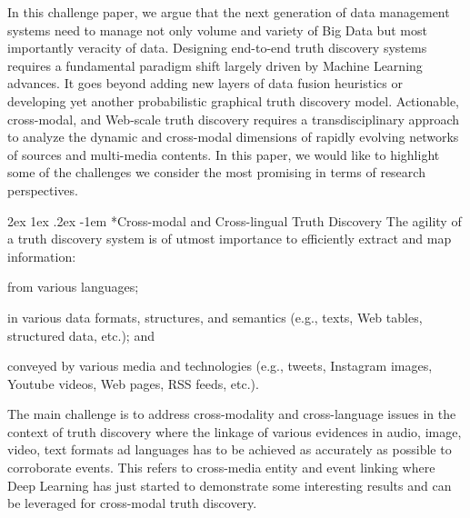 \documentclass[prodmode,acmtecs]{acmsmall} %
\makeatletter
\renewcommand\paragraph{\@startsection{paragraph}{5}{\z@}%
                                       {2ex \@plus1ex \@minus .2ex}%
                                       {-1em}%
                                      {\sffamily\normalsize\bfseries}}
\makeatother
\begin{document}
 In this challenge paper, we argue that the next generation of data management systems need to 
 manage not only volume and variety of Big Data but most importantly veracity of data. Designing
 end-to-end truth discovery systems requires a fundamental paradigm shift largely driven by Machine Learning advances.
 It goes beyond adding new layers of data fusion heuristics or developing yet another probabilistic graphical truth discovery model. 
 Actionable, cross-modal, and Web-scale truth discovery requires a transdisciplinary approach to analyze the dynamic and cross-modal
 dimensions of rapidly evolving networks of sources and multi-media contents. 
In this paper, we would like to highlight some of the challenges we consider the most promising in terms of research perspectives.

%
\vspace*{-0.23cm}
\paragraph*{Cross-modal and Cross-lingual Truth Discovery} 
The agility of a truth discovery system is of utmost importance to efficiently extract and map information: 
\begin{inparaenum}[(i)]
\item from various languages;
\item in various data formats, structures, and semantics (e.g., texts, Web tables, structured data, etc.); and
\item  conveyed by various media and technologies (e.g., tweets, Instagram images, Youtube videos, Web pages, RSS feeds, etc.).
\end{inparaenum}
The main challenge is to address cross-modality and cross-language issues in the context of truth discovery where the linkage of various 
evidences in audio, image, video, text formats ad languages has to be achieved as accurately as possible to corroborate events. This refers
to cross-media entity and event linking where Deep Learning has just started to demonstrate some interesting results and can be leveraged for
cross-modal truth discovery.
\vspace*{-0.23cm}
\end{document}
